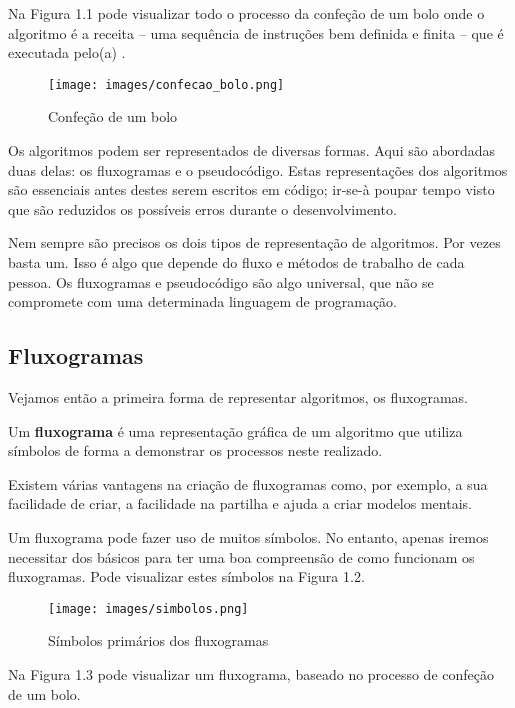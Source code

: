 Na Figura 1.1 pode visualizar todo o processo da confeção de um bolo onde o algoritmo é a receita – uma sequência de instruções bem definida e finita – que é executada pelo(a) .

\begin{figure}[!htbp]
\center\texttt{[image: images/confecao\_bolo.png]}
\caption{Confeção de um bolo}
\end{figure}

Os algoritmos podem ser representados de diversas formas. Aqui são abordadas duas delas: os fluxogramas e o pseudocódigo. Estas representações dos algoritmos são essenciais antes destes serem escritos em código; ir-se-à poupar tempo visto que são reduzidos os possíveis erros durante o desenvolvimento.

Nem sempre são precisos os dois tipos de representação de algoritmos. Por vezes basta um. Isso é algo que depende do fluxo e métodos de trabalho de cada pessoa. Os fluxogramas e pseudocódigo são algo universal, que não se compromete com uma determinada linguagem de programação.

\subsection{Fluxogramas}

Vejamos então a primeira forma de representar algoritmos, os fluxogramas.

\begin{defi}
Um \textbf{fluxograma} é uma representação gráfica de um algoritmo que utiliza símbolos de forma a demonstrar os processos neste realizado.
\end{defi}

Existem várias vantagens na criação de fluxogramas como, por exemplo, a sua facilidade de criar, a facilidade na partilha e ajuda a criar modelos mentais.

Um fluxograma pode fazer uso de muitos símbolos. No entanto, apenas iremos necessitar dos básicos para ter uma boa compreensão de como funcionam os fluxogramas. Pode visualizar estes símbolos na Figura 1.2.

\begin{figure}[!htbp]
\center\texttt{[image: images/simbolos.png]}
\caption{Símbolos primários dos fluxogramas}
\end{figure}

Na Figura 1.3 pode visualizar um fluxograma, baseado no processo de confeção de um bolo.

